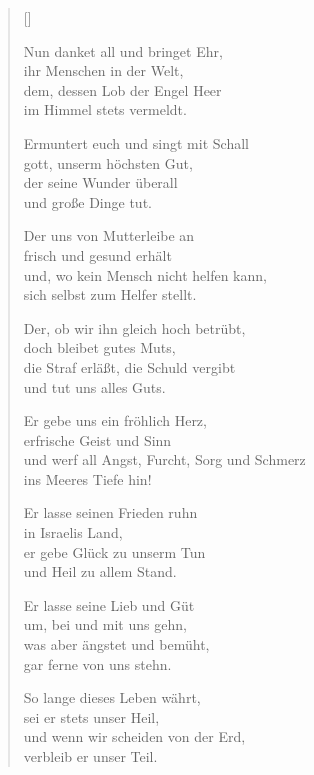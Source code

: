\begin{multicols}{2}
\settowidth{\versewidth}{Ermuntert euch und singt mit Schall}
\begin{verse}[\versewidth]

 Nun danket all und bringet Ehr,\\
ihr Menschen in der Welt,\\
dem, dessen Lob der Engel Heer\\
im Himmel stets vermeldt.

 Ermuntert euch und singt mit Schall\\
gott, unserm höchsten Gut,\\
der seine Wunder überall\\
und große Dinge tut.

 Der uns von Mutterleibe an\\
frisch und gesund erhält\\
und, wo kein Mensch nicht helfen kann,\\
sich selbst zum Helfer stellt.

 Der, ob wir ihn gleich hoch betrübt,\\
doch bleibet gutes Muts,\\
die Straf erläßt, die Schuld vergibt\\
und tut uns alles Guts.

 Er gebe uns ein fröhlich Herz,\\
erfrische Geist und Sinn\\
und werf all Angst, Furcht, Sorg und Schmerz\\
ins Meeres Tiefe hin!

 Er lasse seinen Frieden ruhn\\
in Israelis Land,\\
er gebe Glück zu unserm Tun\\
und Heil zu allem Stand.

 Er lasse seine Lieb und Güt\\
um, bei und mit uns gehn,\\
was aber ängstet und bemüht,\\
gar ferne von uns stehn.

 So lange dieses Leben währt,\\
sei er stets unser Heil,\\
und wenn wir scheiden von der Erd,\\
verbleib er unser Teil.

\end{verse}
\end{multicols}

